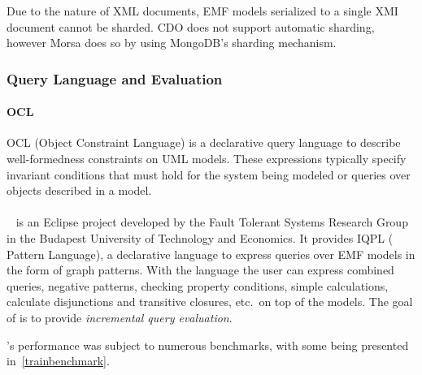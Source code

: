 Due to the nature of XML documents, EMF models serialized to a single XMI document cannot be sharded. CDO does not support automatic sharding, however Morsa does so by using MongoDB's sharding mechanism.

\subsubsection{Query Language and Evaluation}
\label{emf-query-language}

\paragraph{OCL} OCL (Object Constraint Language) is a declarative query language %
to describe well-formedness constraints on UML models. These expressions typically specify invariant conditions that must hold for the system being modeled or queries over objects described in a model. %

\paragraph{\eiq{}} \eiq{}~\cite{icmt2011} is an Eclipse project developed by the Fault Tolerant Systems Research Group in the Budapest University of Technology and Economics. It provides IQPL (\iq{} Pattern Language), a declarative language to express queries over EMF models in the form of graph patterns. With the language the user can express combined queries, negative patterns, checking property conditions, simple calculations, calculate disjunctions and transitive closures, etc.\ on top of the models. The goal of \eiq{} is to provide \emph{incremental query evaluation}.

\eiq{}'s performance was subject to numerous benchmarks, with some being presented in~\autoref{trainbenchmark}. 

